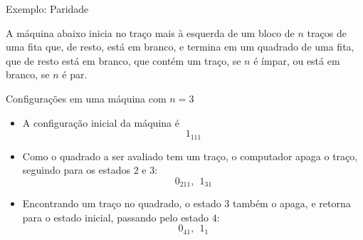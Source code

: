 \begin{frame}[fragile]{Exemplo: Paridade}

    A máquina abaixo inicia no traço mais à esquerda de um bloco de $n$ traços de uma fita que,
    de resto, está em branco, e termina em um quadrado de uma fita, que de resto está em branco,        que contém um traço, se $n$ é ímpar, ou está em branco, se $n$ é par.

    \vspace{0.3in}
    
    \begin{figure}[h]
        \centering
    \end{figure}

\end{frame}


\begin{frame}[fragile]{Configurações em uma máquina com $n=3$}

    \begin{itemize}
        \item A configuração inicial da máquina é
        \[
            1_111
        \]

        \item Como o quadrado a ser avaliado tem um traço, o computador 
            apaga o traço, seguindo para os estados $2$ e $3$:
        \[
            0_211,\ \ 1_31
        \]

        \item Encontrando um traço no quadrado, o estado $3$ também o apaga, e retorna para o
            estado inicial, passando pelo estado $4$:
        \[
            0_41,\ \ 1_1
        \]

    \end{itemize}

\end{frame}

